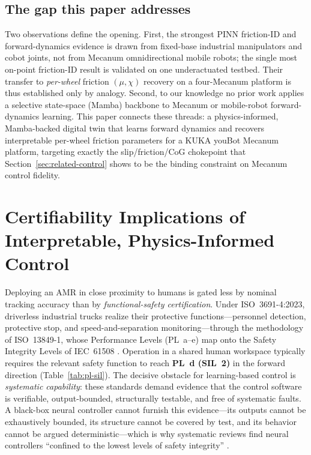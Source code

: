 \documentclass[11pt]{article}
\begin{document}
\subsection{The gap this paper addresses}
\label{sec:related-gap}

Two observations define the opening. First, the strongest PINN friction-ID and
forward-dynamics evidence
\cite{yang2023pinnjoint,fitee2025pinn,wang2025kan,li2025compliant} is drawn from
fixed-base industrial manipulators and cobot joints, not from Mecanum
omnidirectional mobile robots; the single most on-point friction-ID result
\cite{ozmen2026lugre} is validated on one underactuated testbed. Their transfer to
\emph{per-wheel} friction $(\mu,\chi)$ recovery on a four-Mecanum platform is thus
established only by analogy. Second, to our knowledge no prior work applies a
selective state-space (Mamba) backbone to Mecanum or mobile-robot forward-dynamics
learning. This paper connects these threads: a physics-informed, Mamba-backed
digital twin that learns forward dynamics and recovers interpretable per-wheel
friction parameters for a KUKA youBot Mecanum platform, targeting exactly the
slip/friction/CoG chokepoint that Section~\ref{sec:related-control} shows to be the
binding constraint on Mecanum control fidelity.


\appendix

\section{Certifiability Implications of Interpretable, Physics-Informed Control}
\label{app:certifiability}

Deploying an AMR in close proximity to humans is gated less by nominal tracking
accuracy than by \emph{functional-safety certification}. Under ISO~3691-4:2023,
driverless industrial trucks realize their protective functions---personnel
detection, protective stop, and speed-and-separation monitoring---through the
methodology of ISO~13849-1, whose Performance Levels (PL~a--e) map onto the Safety
Integrity Levels of IEC~61508 \cite{iso3691_4,iso13849,iec61508}. Operation in a
shared human workspace typically requires the relevant safety function to reach
\textbf{PL~d (SIL~2)} in the forward direction (Table~\ref{tab:pl-sil}). The
decisive obstacle for learning-based control is \emph{systematic capability}: these
standards demand evidence that the control software is verifiable, output-bounded,
structurally testable, and free of systematic faults. A black-box neural controller
cannot furnish this evidence---its outputs cannot be exhaustively bounded, its
structure cannot be covered by test, and its behavior cannot be argued
deterministic---which is why systematic reviews find neural controllers
``confined to the lowest levels of safety integrity''
\cite{zhang2020nnverif,certifyml2022}.
\end{document}
